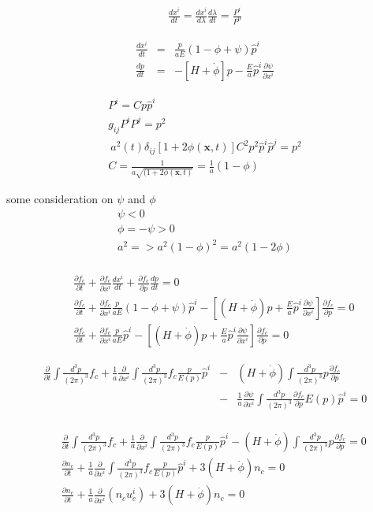 \documentclass[a4paper, 11pt]{article}
\def\ba{\begin{eqnarray}}
\def\ea{\end{eqnarray}}
\begin{document}
\ba
\frac{dx^{i}}{dt} = \frac{dx^{i}}{d\lambda}\frac{d\lambda}{dt} = \frac{P^{i}}{P^{0}}
\ea


\ba
\frac{dx^{i}}{dt} &=& \frac{p}{aE}(1-\phi + \psi)\hat{p}^{i} \\
\frac{dp}{dt} &=& -  [H + \dot{\phi}]p - \frac{E}{a} \hat{p}^{i} \frac{\partial \psi}{\partial x^{i}}
\ea

\ba
P^{i} = C p \hat{p}^{i} \\
g_{ij}P^{i}P^{j} = p^{2} \\\
a^{2}(t)\delta_{ij}[1+2\phi(\bm{x},t)]C^{2} p^{2} \hat{p}^{i} \hat{p}^{j}  = p^{2} \\
C = \frac{1}{a\sqrt{(1+2\phi(\bm{x},t)}} = \frac{1}{a}(1-\phi)
\ea


some consideration on $\psi$ and $\phi$
\ba
\psi < 0 \\
\phi = - \psi > 0 \\
a^{2} => a^{2}(1- \phi)^{2} = a^{2} (1-2\phi) \\
\ea

\ba
&&\frac{\partial f_{c}}{ \partial t} + \frac{\partial f_{c}}{ \partial x^{i}} \frac{dx^{i}}{dt} + \frac{\partial f_{c}}{ \partial p} \frac{dp}{dt}  = 0 \\
&&\frac{\partial f_{c}}{ \partial t} + \frac{\partial f_{c}}{ \partial x^{i}} \frac{p}{aE}(1-\phi + \psi)\hat{p}^{i}  - \left[  (H + \dot{\phi})p + \frac{E}{a} \hat{p}^{i} \frac{\partial \psi}{\partial x^{i}}  \right]\frac{\partial f_{c}}{ \partial p}  = 0 \\
&&\frac{\partial f_{c}}{ \partial t} + \frac{\partial f_{c}}{ \partial x^{i}} \frac{p}{aE}\hat{p}^{i}  - \left[  (H + \dot{\phi})p + \frac{E}{a} \hat{p}^{i} \frac{\partial \psi}{\partial x^{i}}  \right]\frac{\partial f_{c}}{ \partial p}  = 0
\ea

\ba
\frac{\partial}{\partial t} \int \frac{d^{3}p}{(2\pi)^{3}} f_{c}   + \frac{1}{a} \frac{\partial}{ \partial x^{i}} \int \frac{d^{3}p}{(2\pi)^{3}} f_{c} \frac{p}{E(p)}\hat{p}^{i}  &-&   (H + \dot{\phi}) \int \frac{d^{3}p}{(2\pi)^{3}} p \frac{\partial f_{c}}{ \partial p}   \\
&-& \frac{1}{a} \frac{\partial \psi}{\partial x^{i}} \int \frac{d^{3}p}{(2\pi)^{3}} \frac{\partial f_{c}}{ \partial p} E(p) \hat{p}^{i}    = 0 \nonumber \\
\ea

\ba
&&\frac{\partial}{\partial t} \int \frac{d^{3}p}{(2\pi)^{3}} f_{c}   + \frac{1}{a} \frac{\partial}{ \partial x^{i}} \int \frac{d^{3}p}{(2\pi)^{3}} f_{c} \frac{p}{E(p)}\hat{p}^{i}  -   (H + \dot{\phi}) \int \frac{d^{3}p}{(2\pi)^{3}} p \frac{\partial f_{c}}{ \partial p}     = 0 \nonumber \\
&&\frac{\partial n_{c}}{\partial t} + \frac{1}{a}  \frac{\partial}{ \partial x^{i}} \int \frac{d^{3}p}{(2\pi)^{3}} f_{c} \frac{p}{E(p)}\hat{p}^{i} + 3  (H + \dot{\phi}) n_{c} = 0 \\
&&\frac{\partial n_{c}}{\partial t} + \frac{1}{a}  \frac{\partial}{ \partial x^{i}} (n_{c} u^{i}_{c}) + 3  (H + \dot{\phi}) n_{c} = 0
\ea
\end{document}
